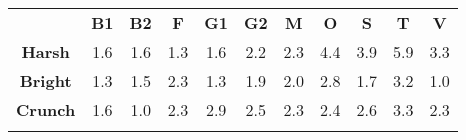 \begin{tabular}{|c||c|c|c|c|c|c|c|c|c|c|}
	\cline{2-11}
	\multicolumn{1}{c|}{} & \bf{B1} & \bf{B2} & \bf{F} & \bf{G1} & \bf{G2} & \bf{M} & \bf{O} & \bf{S} & \bf{T} & \bf{V} \tabularnewline
	\hhline{~|-|-|-|-|-|-|-|-|-|-|}
	\noalign{\vspace{\doublerulesep}}
	\hhline{-||-|-|-|-|-|-|-|-|-|-|}
	\bf{Harsh} & 1.6 & 1.6 & 1.3 & 1.6 & 2.2 & 2.3 & 4.4 & 3.9 & 5.9 & 3.3 \tabularnewline
	\hhline{-||-|-|-|-|-|-|-|-|-|-|}
	\bf{Bright} & 1.3 & 1.5 & 2.3 & 1.3 & 1.9 & 2.0 & 2.8 & 1.7 & 3.2 & 1.0 \tabularnewline
	\hhline{-||-|-|-|-|-|-|-|-|-|-|}
	\bf{Crunch} & 1.6 & 1.0 & 2.3 & 2.9 & 2.5 & 2.3 & 2.4 & 2.6 & 3.3 & 2.3 \tabularnewline
	\hhline{-||-|-|-|-|-|-|-|-|-|-|}
\end{tabular}
